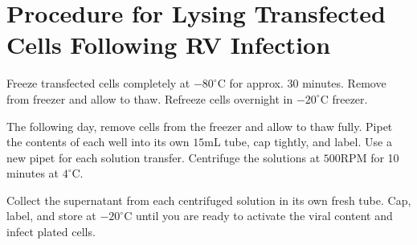 \section{Procedure for Lysing Transfected Cells Following RV Infection}

Freeze transfected cells completely at $-80^{\circ}$C for approx. 30 minutes. Remove from freezer and allow to thaw. Refreeze cells overnight in $-20^{\circ}$C freezer.

The following day, remove cells from the freezer and allow to thaw fully. Pipet the contents of each well into its own $15$mL tube, cap tightly, and label. Use a new pipet for each solution transfer. Centrifuge the solutions at $500$RPM for 10 minutes at $4^{\circ}$C.

Collect the supernatant from each centrifuged solution in its own fresh tube. Cap, label, and store at $-20^{\circ}$C until you are ready to activate the viral content and infect plated cells.